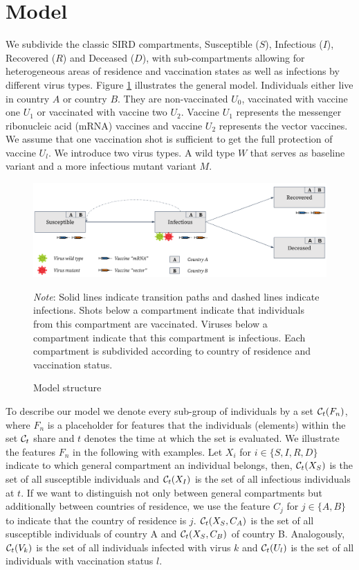 \section{Model}
\label{sec:model}
We subdivide the classic SIRD compartments, Susceptible ($S$), Infectious ($I$), Recovered ($R$) and Deceased ($D$), with sub-compartments allowing for heterogeneous areas of residence and vaccination states as well as infections by different virus types. Figure \ref{fig:model} illustrates the general model. Individuals either live in country $A$ or country $B$. They are non-vaccinated $U_0$, vaccinated with vaccine one $U_1$ or vaccinated with vaccine two $U_2$. Vaccine $U_1$ represents the messenger ribonucleic acid (mRNA) vaccines and vaccine $U_2$ represents the vector vaccines. We assume that one vaccination shot is sufficient to get the full protection of vaccine $U_l$. We introduce two virus types. A wild type $W$ that serves as baseline variant and a more infectious mutant variant $M$.\\
\begin{figure}[h!]
\centering
\includegraphics[scale=0.3]{images/vaccination_pp_blue_orange.png}\\
\begin{flushleft}
\scriptsize{\textit{Note}: Solid lines indicate transition paths and dashed lines indicate infections. Shots below a compartment indicate that individuals from this compartment are vaccinated. Viruses below a compartment indicate that this compartment is infectious. Each compartment is subdivided according to country of residence and vaccination status.}
\end{flushleft}
\caption{Model structure}
\label{fig:model}
\end{figure}

To describe our model we denote every sub-group of individuals by a set $\mathcal{C}_t(F_n)$, where $F_n$ is a placeholder for features that the individuals (elements) within the set $\mathcal{C}_t$ share and $t$ denotes the time at which the set is evaluated. We illustrate the features $F_n$ in the following with examples. Let $X_i$ for $i \in \{S, I, R, D \}$ indicate to which general compartment an individual belongs, then, $\mathcal{C}_t(X_S)$ is the set of all susceptible individuals and $\mathcal{C}_t(X_I)$ is the set of all infectious individuals at $t$. If we want to distinguish not only between general compartments but additionally between countries of residence, we use the feature $C_j$ for $j \in \{A, B\}$ to indicate that the country of residence is $j$. $\mathcal{C}_t(X_S, C_A)$ is the set of all susceptible individuals of country A and $\mathcal{C}_t(X_S, C_B)$ of country B. Analogously, $\mathcal{C}_t(V_k)$ is the set of all individuals infected with virus $k$ and $\mathcal{C}_t(U_l)$ is the set of all individuals with vaccination status $l$.\\

